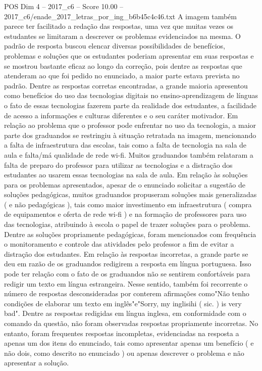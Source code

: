 \begin{textsample}{POS Dim 4 – 2017\_c6 – Score 10.00 – 2017\_c6/enade\_2017\_letras\_por\_ing\_b6b45c4c46.txt}
A imagem também parece ter facilitado a redação das respostas, uma vez que muitas vezes os estudantes se limitaram a descrever os problemas evidenciados na mesma.
O padrão de resposta buscou elencar diversas possibilidades de benefícios, problemas e soluções que os estudantes poderiam apresentar em suas respostas e se mostrou bastante eficaz ao longo da correção, pois dentre as respostas que atenderam ao que foi pedido no enunciado, a maior parte estava prevista no padrão.
Dentre as respostas corretas encontradas, a grande maioria apresentou como benefícios do uso das tecnologias digitais no ensino-aprendizagem de línguas o fato de essas tecnologias fazerem parte da realidade dos estudantes, a facilidade de acesso a informações e culturas diferentes e o seu caráter motivador.
Em relação ao problema que o professor pode enfrentar no uso da tecnologia, a maior parte dos graduandos se restringiu à situação retratada na imagem, mencionando a falta de infraestrutura das escolas, tais como a falta de tecnologia na sala de aula e falta/má qualidade de rede wi-fi.
Muitos graduandos também relataram a falta de preparo do professor para utilizar as tecnologias e a distração dos estudantes ao usarem essas tecnologias na sala de aula.
Em relação às soluções para os problemas apresentados, apesar de o enunciado solicitar a sugestão de soluções pedagógicas, muitos graduandos propuseram soluções mais generalizadas ( e não pedagógicas ), tais como maior investimento em infraestrutura ( compra de equipamentos e oferta de rede wi-fi ) e na formação de professores para uso das tecnologias, atribuindo à escola o papel de trazer soluções para o problema.
Dentre as soluções propriamente pedagógicas, foram mencionados com frequência o monitoramento e controle das atividades pelo professor a fim de evitar a distração dos estudantes.
Em relação às respostas incorretas, a grande parte se deu em razão de os graduandos redigirem a resposta em língua portuguesa.
Isso pode ter relação com o fato de os graduandos não se sentirem confortáveis para redigir um texto em língua estrangeira.
Nesse sentido, também foi recorrente o número de respostas desconsideradas por conterem afirmações como"Não tenho condições de elaborar um texto em inglês"e"Sorry, my inglisihi ( sic. ) is very bad".
Dentre as respostas redigidas em língua inglesa, em conformidade com o comando da questão, não foram observadas respostas propriamente incorretas.
No entanto, foram frequentes respostas incompletas, evidenciadas na resposta a apenas um dos itens do enunciado, tais como apresentar apenas um benefício ( e não dois, como descrito no enunciado ) ou apenas descrever o problema e não apresentar a solução.

\end{textsample}

